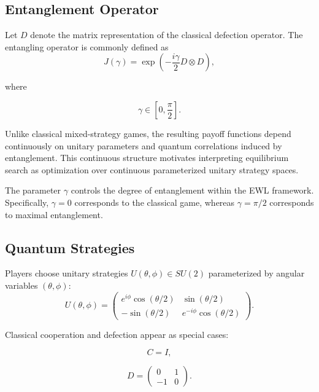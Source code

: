 \subsection{Entanglement Operator}

Let $D$ denote the matrix representation of the classical defection operator. The entangling operator is commonly defined as
\begin{equation}
	J(\gamma)=\exp\left(
	-\frac{i\gamma}{2}D\otimes D
	\right),
\end{equation}

where

\begin{equation}
	\gamma \in \left[0,\frac{\pi}{2}\right].
\end{equation}

Unlike classical mixed-strategy games, the resulting payoff functions depend continuously on unitary parameters and quantum correlations induced by entanglement. This continuous structure motivates interpreting equilibrium search as optimization over continuous parameterized unitary strategy spaces.

The parameter $\gamma$ controls the degree of entanglement within the EWL framework. Specifically, $\gamma = 0$ corresponds to the classical game, whereas $\gamma = \pi/2$ corresponds to maximal entanglement.

\subsection{Quantum Strategies}

Players choose unitary strategies $U(\theta,\phi)\in SU(2)$ parameterized by angular variables $(\theta,\phi)$:
\begin{equation}
	U(\theta,\phi)
	=
	\begin{pmatrix}
		e^{i\phi}\cos(\theta/2)
		&
		\sin(\theta/2)
		\\
		-\sin(\theta/2)
		&
		e^{-i\phi}\cos(\theta/2)
	\end{pmatrix}.
\end{equation}

Classical cooperation and defection appear as special cases:

\begin{equation}
	C = I,
\end{equation}

\begin{equation}
	D =
	\begin{pmatrix}
		0 & 1 \\
		-1 & 0
	\end{pmatrix}.
\end{equation}


